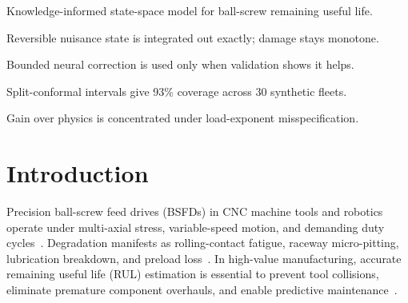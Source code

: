 \documentclass[a4paper,fleqn]{cas-dc}
\begin{document}
\begin{highlights}
\item Knowledge-informed state-space model for ball-screw remaining useful life.
\item Reversible nuisance state is integrated out exactly; damage stays monotone.
\item Bounded neural correction is used only when validation shows it helps.
\item Split-conformal intervals give 93\% coverage across 30 synthetic fleets.
\item Gain over physics is concentrated under load-exponent misspecification.
\end{highlights}

\section{Introduction}
\label{sec:intro}

Precision ball-screw feed drives (BSFDs) in CNC machine tools and robotics operate under multi-axial stress, variable-speed motion, and demanding duty cycles~\cite{Lei_2018, H_Li_2024, Wu_2024, Aivaliotis_2021}. Degradation manifests as rolling-contact fatigue, raceway micro-pitting, lubrication breakdown, and preload loss~\cite{Hanbo_2024, Martin_2024, Heydarnia_2025}. In high-value manufacturing, accurate remaining useful life (RUL) estimation is essential to prevent tool collisions, eliminate premature component overhauls, and enable predictive maintenance~\cite{Lei_2018, H_Li_2024, Zhang_2025, Tai_2023, Yuan_2024, Jia_2019}.
\end{document}
